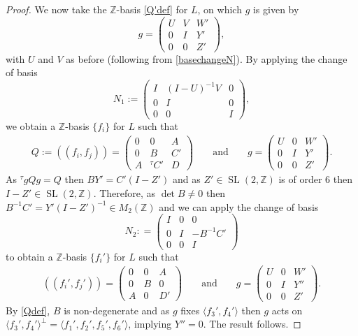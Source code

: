\documentclass[12pt, a4paper]{article}
\newcommand{\ZZ}{\mathbb{Z}}
\newcommand{\la}{\langle}
\newcommand{\ra}{\rangle}
\newcommand{\opn}{\operatorname}
\begin{document}
\begin{proof}
  We now take the $\ZZ$-basis \eqref{Q'def} for $L$, on which $g$ is given by
  \[
    g =
    \begin{pmatrix}
      U & V & W' \\
      0 & I & Y' \\
      0 & 0 & Z'
    \end{pmatrix},
  \]
  with $U$ and $V$ as before (following from \eqref{basechangeN}).
  By applying the change of basis  
  \[
    N_1:=
    \begin{pmatrix}
      I & (I-U)^{-1}V & 0 \\
      0 & I & 0 \\
      0 & 0 & I
    \end{pmatrix}, 
  \]
  we obtain a $\ZZ$-basis $\{f_i \}$ for $L$ such that
  \begin{align*}
    Q:= ((f_i,f_j)) =
    \begin{pmatrix}
      0 & 0 & A \\
      0 & B & C' \\
      A & {}^{\tau}C' & D
    \end{pmatrix} 
    &&
    \text{ and }  
    &&
    g =
    \begin{pmatrix}
      U & 0 & W' \\
      0 & I & Y' \\
      0 & 0 & Z'
    \end{pmatrix}.
    \end{align*}
    As ${}^{\tau}g Q g = Q$ then $BY' = C'(I - Z')$ and as  $Z' \in \opn{SL}(2, \ZZ)$ is of order 6 then $I - Z' \in \opn{SL}(2, \ZZ)$.
  Therefore, as $\opn{det} B \neq 0$ then $B^{-1} C' = Y'(I-Z')^{-1} \in M_2(\ZZ)$ and we can apply the change of basis
  \begin{equation*}
    N_2 : =
    \begin{pmatrix}
      I & 0 & 0 \\
      0 & I & -B^{-1} C' \\
      0 & 0 & I
    \end{pmatrix}
  \end{equation*}
  to obtain a $\ZZ$-basis $\{f_i'\}$ for $L$ such that
  \begin{align}\label{bcsplitbasis}
    ((f_i',f_j')) =
    \begin{pmatrix}
      0 & 0 & A \\
      0 & B & 0 \\
      A & 0 & D'
    \end{pmatrix}
    &&
    \text{ and }
    && g=
    \begin{pmatrix}
      U & 0 & W' \\
      0 & I & Y'' \\
      0 & 0 & Z'
    \end{pmatrix}.
  \end{align}
  By \eqref{Qdef}, $B$ is non-degenerate and as $g$ fixes $\la f_3', f_4' \ra$ then $g$ acts on
  $\la f_3', f_4' \ra^{\perp} = \la f_1',f_2',f_5',f_6' \ra$,
  implying $Y''=0$. 
  The result follows.
\end{proof}
\end{document}
